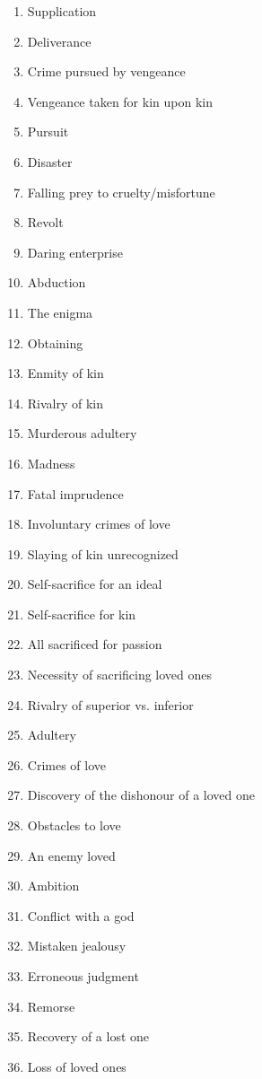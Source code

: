 \documentclass[11pt]{report}
\begin{document}
\begin{multicols}{2}
\begin{enumerate}
  \item Supplication
  \item Deliverance
  \item Crime pursued by vengeance
  \item Vengeance taken for kin upon kin
  \item Pursuit
  \item Disaster
  \item Falling prey to cruelty/misfortune
  \item Revolt
  \item Daring enterprise
  \item Abduction
  \item The enigma
  \item Obtaining
  \item Enmity of kin
  \item Rivalry of kin
  \item Murderous adultery
  \item Madness
  \item Fatal imprudence
  \item Involuntary crimes of love
  \item Slaying of kin unrecognized
  \item Self-sacrifice for an ideal
  \item Self-sacrifice for kin
  \item All sacrificed for passion
  \item Necessity of sacrificing loved ones
  \item Rivalry of superior vs. inferior
  \item Adultery
  \item Crimes of love
  \item Discovery of the dishonour of a loved one
  \item Obstacles to love
  \item An enemy loved
  \item Ambition
  \item Conflict with a god
  \item Mistaken jealousy
  \item Erroneous judgment
  \item Remorse
  \item Recovery of a lost one
  \item Loss of loved ones
\end{enumerate}
\end{multicols}
\end{document}
